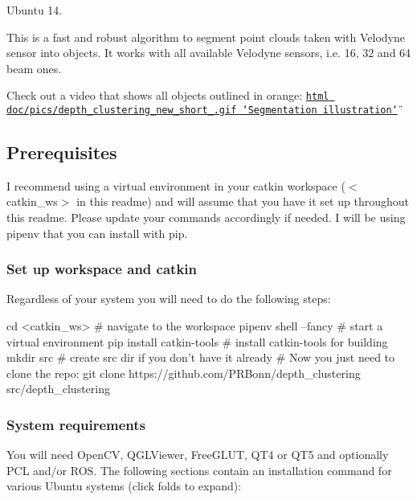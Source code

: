 Ubuntu 14.

\href{https://travis-ci.org/PRBonn/depth_clustering}{\tt } \href{https://www.codacy.com/project/zabugr/depth_clustering/dashboard?utm_source=github.com&amp;utm_medium=referral&amp;utm_content=PRBonn/depth_clustering&amp;utm_campaign=Badge_Grade_Dashboard}{\tt } \href{https://coveralls.io/github/PRBonn/depth_clustering}{\tt }

This is a fast and robust algorithm to segment point clouds taken with Velodyne sensor into objects. It works with all available Velodyne sensors, i.\+e. 16, 32 and 64 beam ones.

Check out a video that shows all objects outlined in orange\+: \href{https://www.youtube.com/watch?v=UXHX9kFGXfg}{\tt html doc/pics/depth\+\_\+clustering\+\_\+new\+\_\+short\+\_.\+gif \char`\"{}\+Segmentation illustration\char`\"{}}

\subsection*{Prerequisites}

I recommend using a virtual environment in your catkin workspace ({\ttfamily $<$catkin\+\_\+ws$>$} in this readme) and will assume that you have it set up throughout this readme. Please update your commands accordingly if needed. I will be using {\ttfamily pipenv} that you can install with {\ttfamily pip}.

\subsubsection*{Set up workspace and catkin}

Regardless of your system you will need to do the following steps\+: 
\begin{DoxyCode}
cd <catkin\_ws>            # navigate to the workspace
pipenv shell --fancy      # start a virtual environment
pip install catkin-tools  # install catkin-tools for building
mkdir src                 # create src dir if you don't have it already
# Now you just need to clone the repo:
git clone https://github.com/PRBonn/depth\_clustering src/depth\_clustering
\end{DoxyCode}


\subsubsection*{System requirements}

You will need Open\+CV, Q\+G\+L\+Viewer, Free\+G\+L\+UT, Q\+T4 or Q\+T5 and optionally P\+CL and/or R\+OS. The following sections contain an installation command for various Ubuntu systems (click folds to expand)\+:

